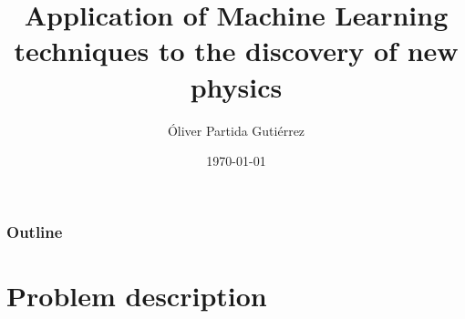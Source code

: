 \documentclass{beamer}
\title[Discovery of New Physics with ML]{Application of Machine Learning techniques to the discovery of new physics} %
\author{Óliver Partida Gutiérrez} %
\institute[UAB] %
{
UAB \\ %
\medskip

}
\date{\today} %
\begin{document}
\begin{frame}
\titlepage %
\end{frame}

\begin{frame}
\frametitle{Outline} %
\tableofcontents %
\end{frame}


\section{Problem description} %


\end{document}

